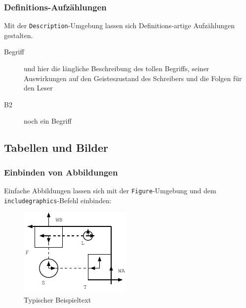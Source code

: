     \subsubsection{Definitions-Aufzählungen}
        Mit der \texttt{Description}-Umgebung lassen sich Definitions-artige Aufzählungen
        gestalten.
        \begin{description}
            \item[Begriff] und hier die längliche Beschreibung des tollen Begriffs,
            seiner Auswirkungen auf den Geisteszustand des Schreibers und die Folgen für
            den Leser
            \item[B2] noch ein Begriff
        \end{description}
    
    
    
\subsection{Tabellen und Bilder}
    \subsubsection{Einbinden von Abbildungen}
        Einfache Abbildungen lassen sich mit der \texttt{Figure}-Umgebung und dem
        \texttt{includegraphics}-Befehl einbinden:
        \begin{figure}
            \centering
            \includegraphics[scale=1.4]{fig/exampleSzene}   
            \caption{Typischer Beispieltext}
            \label{fig:beispielText}
        \end{figure}
            
